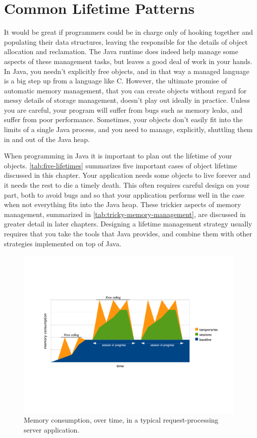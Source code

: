 \chapter{Common Lifetime Patterns}

It would be great if programmers could be in charge only of hooking together and
populating their data structures, leaving the \jre responsible for the details
of object allocation and reclamation. The Java runtime does indeed help manage some
aspects of these management tasks, but leaves a good deal of work in your hands.
In Java, you needn't explicitly free objects, and in that way a managed language
is a big step up from a language like C. However, the ultimate promise of
automatic memory management, that you can create objects without regard for messy
details of storage management, doesn't play out ideally in practice. Unless you
are careful, your program will suffer from bugs such as memory leaks, and suffer
from poor performance. Sometimes, your objects don't easily fit into the limits
of a single Java process, and you need to manage, explicitly, shuttling them in
and out of the Java heap.

When programming in Java it is important to plan out the lifetime of your
objects. \autoref{tab:five-lifetimes} summarizes five important cases of object
lifetime discussed in this chapter. Your application needs some objects to live
forever and it needs the rest to die a timely death. This often requires careful
design on your part, both to avoid bugs and so that your application performs
well in the case when not everything fits into the Java heap. These trickier
aspects of memory management, summarized in
\autoref{tab:tricky-memory-management}, are discussed in greater detail in later
chapters. Designing a lifetime management strategy usually requires that you take
the tools that Java provides, and combine them with other strategies implemented
on top of Java.

\begin{figure}
	\centering
	\includegraphics[width=\textwidth]{Figures/lifetime/timeline-base-session-temps}
	\caption{Memory consumption, over time, in a typical request-processing server
	application.}
	\label{fig:timeline-base-session-temps}
\end{figure}

